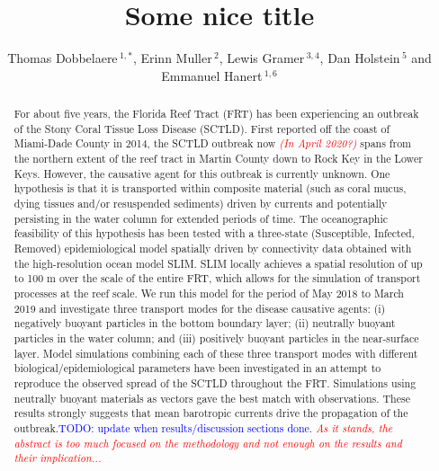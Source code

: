 \documentclass[utf8]{frontiersSCNS}
\newcommand{\emphc}[1]{\emph{\textcolor{red}{#1}}}
\def\keyFont{\fontsize{8}{11}\helveticabold }
\def\firstAuthorLast{Dobbelaere {et~al.}} %
\def\Authors{Thomas Dobbelaere\,$^{1,*}$, Erinn Muller\,$^{2}$, Lewis Gramer\,$^{3,4}$, Dan Holstein\,$^{5}$  and Emmanuel Hanert\,$^{1,6}$}
\begin{document}
\onecolumn
{}

\title[Some alt title]{Some nice title}

\author[\firstAuthorLast ]{\Authors} %
\address{} %
\correspondance{} %
\extraAuth{}

\maketitle
\begin{abstract}
For about five years, the Florida Reef Tract (FRT) has been experiencing an outbreak of the Stony Coral Tissue Loss Disease (SCTLD). First reported off the coast of Miami-Dade County in 2014, the SCTLD outbreak now \emphc{(In April 2020?)} spans from the northern extent of the reef tract in Martin County down to Rock Key in the Lower Keys. However, the causative agent for this outbreak is currently unknown. One hypothesis is that it is transported within composite material (such as coral mucus, dying tissues and/or resuspended sediments) driven by currents and potentially persisting in the water column for extended periods of time. The oceanographic feasibility of this hypothesis has been tested with a three-state (Susceptible, Infected, Removed) epidemiological model spatially driven by connectivity data obtained with the high-resolution ocean model SLIM. SLIM locally achieves a spatial resolution of up to 100 m over the scale of the entire FRT, which allows for the simulation of transport processes at the reef scale. We run this model for the period of May 2018 to March 2019 and investigate three transport modes for the disease causative agents: (i) negatively buoyant particles in the bottom boundary layer; (ii) neutrally buoyant particles in the water column; and (iii) positively buoyant particles in the near-surface layer. Model simulations combining each of these three transport modes with different biological/epidemiological parameters have been investigated in an attempt to reproduce the observed spread of the SCTLD throughout the FRT. Simulations using neutrally buoyant materials as vectors gave the best match with observations. These results strongly suggests that mean barotropic currents drive the propagation of the outbreak.\textcolor{blue}{TODO: update when results/discussion sections done.} \emphc{As it stands, the abstract is too much focused on the methodology and not enough on the results and their implication...} 

\tiny
\keyFont{ \section{Keywords:} Some nice keywords} 
\end{abstract}
\end{document}
